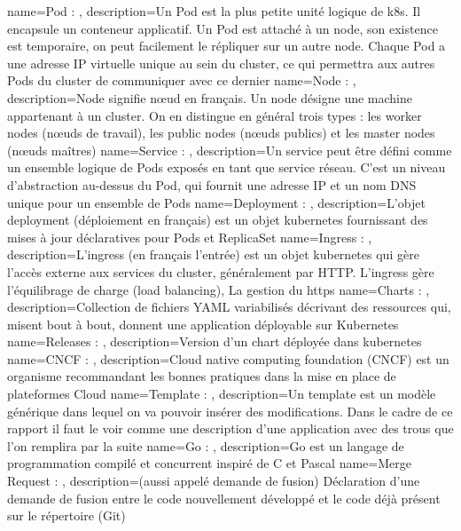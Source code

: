 {
    name=Pod : ,
    description={Un Pod est la plus petite unité logique de k8s. Il encapsule un conteneur applicatif. Un Pod est attaché à un node, son existence est temporaire, on peut facilement le répliquer sur un autre node. Chaque Pod a une adresse IP virtuelle unique au sein du cluster, ce qui permettra aux autres Pods du cluster de communiquer avec ce dernier}
}
{
    name=Node : ,
    description={Node signifie nœud en français. Un node désigne une machine appartenant à un cluster. On en distingue en général trois types : les worker nodes (nœuds de travail), les public nodes (nœuds publics) et les master nodes (nœuds maîtres)}
}
{
    name=Service : ,
    description={Un service peut être défini comme un ensemble logique de Pods exposés en tant que service réseau. C’est un niveau d’abstraction au-dessus du Pod, qui fournit une adresse IP et un nom DNS unique pour un ensemble de Pods}
}
{
    name=Deployment : ,
    description={L'objet deployment (déploiement en français) est un objet kubernetes fournissant des mises à jour déclaratives pour Pods et ReplicaSet}
}
{
    name=Ingress : ,
    description={L'ingress (en français l'entrée) est un objet kubernetes qui gère l'accès externe aux services du cluster, généralement par HTTP. L'ingress gère l'équilibrage de charge (load balancing), La gestion du https}
}
{
    name=Charts : ,
    description={Collection de fichiers YAML variabilisés décrivant des ressources qui, misent bout à bout, donnent une application déployable sur Kubernetes}
}
{
    name=Releases : ,
    description={Version d'un chart déployée dans kubernetes}
}
{
    name=CNCF : ,
    description={Cloud native computing foundation (CNCF) est un organisme recommandant les bonnes pratiques dans la mise en place de plateformes Cloud}
}
{
    name=Template : ,
    description={Un template est un modèle générique dans lequel on va pouvoir insérer des modifications. Dans le cadre de ce rapport il faut le voir comme une description d'une application avec des trous que l'on remplira par la suite}
}
{
    name=Go : ,
    description={Go est un langage de programmation compilé et concurrent inspiré de C et Pascal}
}
{
    name=Merge Request : ,
    description={(aussi appelé demande de fusion) Déclaration d'une demande de fusion entre le code nouvellement développé et le code déjà présent sur le répertoire (Git)}
}
